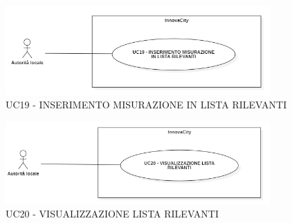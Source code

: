 

















\newpage

\begin{figure}[H]
    \centering
    \includegraphics[width=0.9\textwidth]{../Images/uc19.PNG}
    \caption{UC19 - INSERIMENTO MISURAZIONE IN LISTA RILEVANTI }
\end{figure}


\begin{figure}[H]
    \centering
    \includegraphics[width=0.9\textwidth]{../Images/uc20.PNG}
    \caption{UC20 - VISUALIZZAZIONE LISTA RILEVANTI }
\end{figure}


